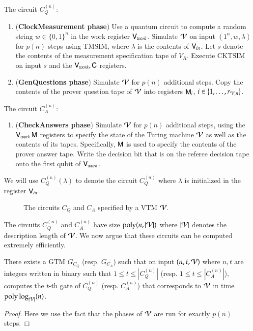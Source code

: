 \begin{center}
\begin{mdframed}
	The circuit $C_Q^{(n)}$:
	  \begin{enumerate}
        \item (\textbf{ClockMeasurement phase}) Use a quantum circuit to compute a random string $w \in \{0,1\}^n$ in the work register ${\mathsf{V}}_{work}$. 
Simulate $\mathcal V$ on input $(1^n,w,\lambda)$ for $p(n)$ steps using TMSIM, where $\lambda$ is the contents of ${\mathsf{V}}_{in}$. Let $s$ denote the contents of the measurement specification tape of $V_R$.   Execute CKTSIM on input $s$ and the ${\mathsf{V}}_{work}, {\mathsf{C}}$ registers.%
        \item (\textbf{GenQuestions phase}) Simulate $\mathcal V$ for $p(n)$ additional steps. Copy the contents of the prover question tape of $\mathcal V$ into registers ${\mathsf{M}}_{i}$, $i\in\{1,\ldots,r_{\mathcal V,n}\}$.
    \end{enumerate}
    
    \medskip
	The circuit $C_A^{(n)}$:
	  \begin{enumerate}    
        \item (\textbf{CheckAnswers phase}) Simulate $\mathcal V$ for $p(n)$ additional steps, using the ${\mathsf{V}}_{work} \, {\mathsf{M}}$ registers to specify the state of the Turing machine $\mathcal V$ as well as the contents of its tapes. Specifically, ${\mathsf{M}}$ is used to specify the contents of the prover answer tape. Write the decision bit that is on the referee decision tape onto the first qubit of ${\mathsf{V}}_{work}$.
        \end{enumerate}    
        
        \medskip
       	We will use $C_Q^{(n)}(\lambda)$ to denote the circuit $C_Q^{(n)}$ where $\lambda$ is initialized in the register ${\mathsf{V}}_{in}$.
\end{mdframed}
\begin{figure}[H]
\caption{The circuits $C_Q$ and $C_A$ specified by a VTM $\mathcal V$.}
\label{fig:vtm_circuits}
\end{figure}
\end{center}

The circuits $C_Q^{(n)}$ and $C_A^{(n)}$ have size $\operatorname{poly}(n,|\mathcal V|)$ where $|\mathcal V|$ denotes the description length of $\mathcal V$. We now argue that these circuits can be computed extremely efficiently. 
\begin{lemma}
\label{lem:succinct_vtm_circuits}
	There exists a GTM $G_{C_Q}$ (resp. $G_{C_A}$) such that on input $(n,t,\mathcal V)$ where $n,t$ are integers written in binary such that $1 \leq t \leq |C_Q^{(n)}|$ (resp. $1 \leq t \leq |C_A^{(n)}|$), computes the $t$-th gate of $C_Q^{(n)}$ (resp. $C_A^{(n)}$) that corresponds to $\mathcal V$ in time $\operatorname{poly} \log_{|\mathcal V|} (n)$.
\end{lemma}
\begin{proof}
Here we use the fact that the phases of $\mathcal V$ are run for exactly $p(n)$ steps.
\end{proof}


